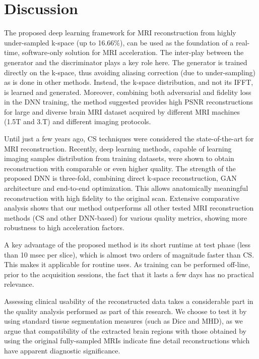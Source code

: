\documentclass[review]{elsarticle}
\begin{document}
\section{Discussion}\label{conclusions_section}
The proposed deep learning framework for MRI reconstruction from highly under-sampled k-space (up to 16.66\%), can be used as the foundation of a real-time, software-only solution for MRI acceleration.
The inter-play between the generator and the discriminator plays a key role here. The generator is trained directly on the k-space, thus avoiding aliasing correction (due to under-sampling) as is done in other methods.
Instead, the k-space distribution, and not its IFFT, is learned and generated. Moreover, combining both adversarial and fidelity loss in the DNN training, the method suggested provides high PSNR reconstructions for large and diverse brain MRI dataset acquired by different MRI machines (1.5T and 3.T) and different imaging protocols.

Until just a few years ago, CS techniques were considered the state-of-the-art for MRI reconstruction. Recently, deep learning methods, capable of learning imaging samples distribution from training datasets, were shown to obtain reconstruction with comparable or even higher quality. The strength of the proposed DNN is three-fold, combining direct k-space reconstruction, GAN architecture and end-to-end optimization.
This allows anatomically meaningful reconstruction with high fidelity to the original scan. Extensive comparative analysis shows that our method outperforms all other tested MRI reconstruction methods (CS and other DNN-based) for various quality metrics, showing more robustness to high acceleration factors.

A key advantage of the proposed method is its short runtime at test phase (less than 10 msec per slice), which is almost two orders of magnitude faster than CS. This makes it applicable for routine uses. As training can be performed off-line, prior to the acquisition sessions, the fact that it lasts a few days has no practical relevance.

Assessing clinical usability of the reconstructed data takes a considerable part in the quality analysis performed as part of this research. We choose to test it by using standard tissue segmentation measures (such as Dice and MHD), as we argue that compatibility of the extracted brain regions with those obtained by using the original fully-sampled MRIs indicate fine detail reconstructions which have apparent diagnostic significance. 
\end{document}
